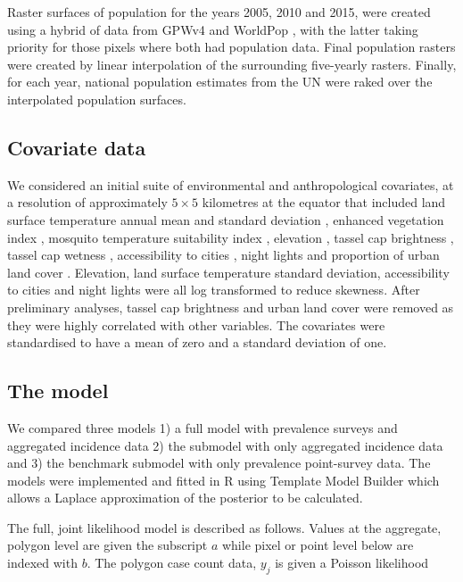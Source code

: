 \documentclass[10pt,letterpaper]{article}
\begin{document}
Raster surfaces of population for the years 2005, 2010 and 2015, were created using a hybrid of data from GPWv4 \cite{gpw4} and WorldPop \cite{tatem2017worldpop}, with the latter taking priority for those pixels where both had population data. 
Final population rasters were created by linear interpolation of the surrounding five-yearly rasters.
Finally, for each year, national population estimates from the UN were raked over the interpolated population surfaces. 

\subsection*{Covariate data}

We considered an initial suite of environmental and anthropological covariates, at a resolution of approximately $5 \times 5$ kilometres at the equator that included land surface temperature annual mean and standard deviation \cite{LST}, enhanced vegetation index \cite{TCB}, mosquito temperature suitability index \cite{weiss2014air}, elevation \cite{SRTMElev}, tassel cap brightness \cite{TCB}, tassel cap wetness \cite{TCB}, accessibility to cities \cite{weiss2018global}, night lights \cite{} and proportion of urban land cover \cite{}.
Elevation, land surface temperature standard deviation, accessibility to cities and night lights were all log transformed to reduce skewness.
After preliminary analyses, tassel cap brightness and urban land cover were removed as they were highly correlated with other variables.
The covariates were standardised to have a mean of zero and a standard deviation of one.

\subsection*{The model}

We compared three models 1) a full model with prevalence surveys and aggregated incidence data 2) the submodel with only aggregated incidence data and 3) the benchmark submodel with only prevalence point-survey data. 
The models were implemented and fitted in R \cite{R} using Template Model Builder \cite{TMB} which allows a Laplace approximation of the posterior to be calculated.

The full, joint likelihood model is described as follows. 
Values at the aggregate, polygon level are given the subscript $a$ while pixel or point level below are indexed with $b$.
The polygon case count data, $y_j$ is given a Poisson likelihood
\end{document}
